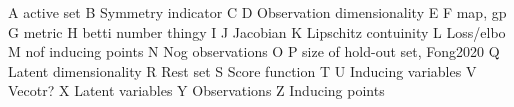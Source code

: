 A active set
B Symmetry indicator
C 
D Observation dimensionality
E 
F map, gp
G metric
H betti number thingy
I
J Jacobian
K Lipschitz contuinity
L Loss/elbo
M nof inducing points
N Nog observations
O
P size of hold-out set, Fong2020
Q Latent dimensionality
R Rest set
S Score function
T
U Inducing variables
V Vecotr?
X Latent variables
Y Observations
Z Inducing points
%



